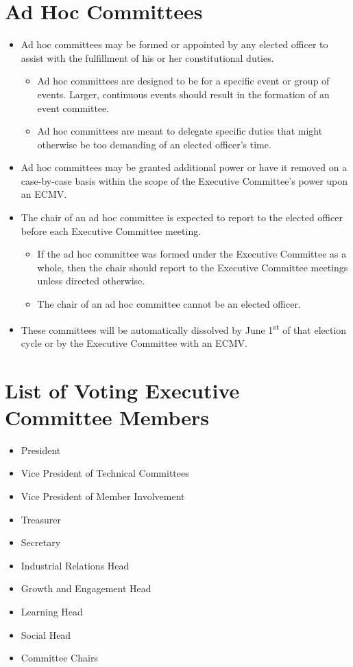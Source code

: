 \documentclass[12pt]{constitution}
\newcommand{\datetermstart}{June 1\textsuperscript{st}} %
\begin{document}
\section{Ad Hoc Committees}
\label{sec:exec_adhoc}
\begin{itemize}
    \item Ad hoc committees may be formed or appointed by any elected officer to assist with the fulfillment of his or her constitutional duties.
    \begin{itemize}
        \item Ad hoc committees are designed to be for a specific event or group of events. Larger, continuous events should result in the formation of an event committee.
        \item Ad hoc committees are meant to delegate specific duties that might otherwise be too demanding of an elected officer's time.
    \end{itemize}
    \item Ad hoc committees may be granted additional power or have it removed on a case-by-case basis within the scope of the Executive Committee's power upon an ECMV.
    \item The chair of an ad hoc committee is expected to report to the elected officer before each Executive Committee meeting.
    \begin{itemize}
        \item If the ad hoc committee was formed under the Executive Committee as a whole, then the chair should report to the Executive Committee meetings unless directed otherwise.
	\item The chair of an ad hoc committee cannot be an elected officer.
    \end{itemize}
    \item These committees will be automatically dissolved by \datetermstart{} of that election cycle or by the Executive Committee with an ECMV.
\end{itemize}


\label{art:officers}

\section{List of Voting Executive Committee Members}
\label{sec:officer_list}
\begin{itemize}
    \item President
    \item Vice President of Technical Committees
    \item Vice President of Member Involvement
    \item Treasurer
    \item Secretary
    \item Industrial Relations Head
    \item Growth and Engagement Head
    \item Learning Head
    \item Social Head
    \item Committee Chairs
\end{itemize}
\end{document}
